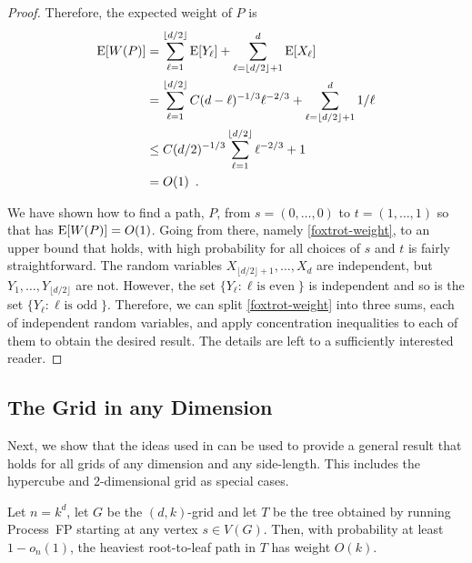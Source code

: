 \documentclass{patmorin}
\begin{document}
\begin{proof}
  Therefore, the expected weight of $P$ is 
  \begin{align*}
      \mathrm{E}[W(P)] & = \sum_{\ell=1}^{\lfloor d/2\rfloor} \mathrm{E}[Y_\ell] +
              \sum_{\ell=\lfloor d/2\rfloor+1}^d \mathrm{E}[X_\ell] \\
    & = \sum_{\ell=1}^{\lfloor d/2\rfloor} C(d-\ell)^{-1/3}\ell^{-2/3} +
     \sum_{\ell=\lfloor d/2\rfloor+1}^d 1/\ell \\
     & \le
     C(d/2)^{-1/3}\sum_{\ell=1}^{\lfloor d/2\rfloor} \ell^{-2/3} + 1 \\
     & = O(1) \enspace .
  \end{align*}

  We have shown how to find a path, $P$, from $s=(0,\ldots,0)$ to
  $t=(1,\ldots,1)$ so that has $\mathrm{E}[W(P)]=O(1)$.  Going from there,
  namely \eqref{foxtrot-weight}, to an upper bound that holds, with high
  probability for all choices of $s$ and $t$ is fairly straightforward.
  The random variables $X_{\lfloor d/2\rfloor+1},\ldots,X_d$ are
  independent, but $Y_1,\ldots,Y_{\lfloor d/2\rfloor}$ are not. However,
  the set $\{Y_\ell : \mbox{$\ell$ is even} \}$ is independent and so is
  the set $\{Y_\ell : \mbox{$\ell$ is odd} \}$.  Therefore, we can split
  \eqref{foxtrot-weight} into three sums, each of independent random
  variables, and apply concentration inequalities to each of them to
  obtain the desired result. The details are left to a sufficiently
  interested reader.
\end{proof}

\subsection{The Grid in any Dimension}

Next, we show that the ideas used in 
can be used to provide a general result that holds for all grids of
any dimension and any side-length.  This includes the hypercube and
2-dimensional grid as special cases.

\begin{thm}
   Let $n=k^d$, let $G$ be the $(d,k)$-grid
   and let $T$ be the tree obtained by running Process~FP starting at
   any vertex $s\in V(G)$.  Then, with probability at least $1-o_n(1)$,
   the heaviest root-to-leaf path in $T$ has weight $O(k)$.
\end{thm}
\end{document}
